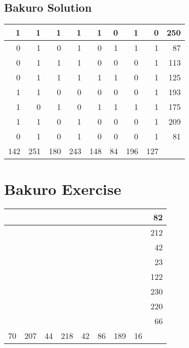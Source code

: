 \documentclass[]{article}
\begin{document}
 \subsection{Bakuro Solution} 
\begin{tabular}{rrrrrrrrr}
\hline
   1 &   1 &   1 &   1 &   1 &  0 &   1 &   0 & 250 \\ \hline
   0 &   1 &   0 &   1 &   0 &  1 &   1 &   1 &  87 \\ \hline
   0 &   1 &   1 &   1 &   0 &  0 &   0 &   1 & 113 \\ \hline
   0 &   1 &   1 &   1 &   1 &  1 &   0 &   1 & 125 \\ \hline
   1 &   1 &   0 &   0 &   0 &  0 &   0 &   1 & 193 \\ \hline
   1 &   0 &   1 &   0 &   1 &  1 &   1 &   1 & 175 \\ \hline
   1 &   1 &   0 &   1 &   0 &  0 &   0 &   1 & 209 \\ \hline
   0 &   1 &   0 &   1 &   0 &  0 &   0 &   1 &  81 \\ \hline
 142 & 251 & 180 & 243 & 148 & 84 & 196 & 127 &     \\ \hline
\hline
\end{tabular}\newpage\section{Bakuro Exercise}\begin{tabular}{rrrrrrrrr}
\hline
    &     &    &     &    &    &     &    &  82 \\ \hline
    &     &    &     &    &    &     &    & 212 \\ \hline
    &     &    &     &    &    &     &    &  42 \\ \hline
    &     &    &     &    &    &     &    &  23 \\ \hline
    &     &    &     &    &    &     &    & 122 \\ \hline
    &     &    &     &    &    &     &    & 230 \\ \hline
    &     &    &     &    &    &     &    & 220 \\ \hline
    &     &    &     &    &    &     &    &  66 \\ \hline
 70 & 207 & 44 & 218 & 42 & 86 & 189 & 16 &     \\ \hline
\hline
\end{tabular}\newpage 
\end{document}
